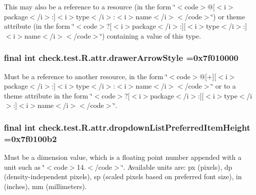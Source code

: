 This may also be a reference to a resource (in the form \char`\"{}$<$code$>$@\mbox{[}$<$i$>$package$<$/i$>$\+:\mbox{]}$<$i$>$type$<$/i$>$\+:$<$i$>$name$<$/i$>$$<$/code$>$\char`\"{}) or theme attribute (in the form \char`\"{}$<$code$>$?\mbox{[}$<$i$>$package$<$/i$>$\+:\mbox{]}\mbox{[}$<$i$>$type$<$/i$>$\+:\mbox{]}$<$i$>$name$<$/i$>$$<$/code$>$\char`\"{}) containing a value of this type. \hypertarget{classcheck_1_1test_1_1_r_1_1attr_a53bf9b90288295d77d63143853ca2beb}{}
\subsubsection[{drawer\+Arrow\+Style}]{\setlength{\rightskip}{0pt plus 5cm}final int check.\+test.\+R.\+attr.\+drawer\+Arrow\+Style =0x7f010000\hspace{0.3cm}{\ttfamily [static]}}\label{classcheck_1_1test_1_1_r_1_1attr_a53bf9b90288295d77d63143853ca2beb}
Must be a reference to another resource, in the form \char`\"{}$<$code$>$@\mbox{[}+\mbox{]}\mbox{[}$<$i$>$package$<$/i$>$\+:\mbox{]}$<$i$>$type$<$/i$>$\+:$<$i$>$name$<$/i$>$$<$/code$>$\char`\"{} or to a theme attribute in the form \char`\"{}$<$code$>$?\mbox{[}$<$i$>$package$<$/i$>$\+:\mbox{]}\mbox{[}$<$i$>$type$<$/i$>$\+:\mbox{]}$<$i$>$name$<$/i$>$$<$/code$>$\char`\"{}. \hypertarget{classcheck_1_1test_1_1_r_1_1attr_ae7b7ef58aa08b5cd48e82ced09e17dca}{}
\subsubsection[{dropdown\+List\+Preferred\+Item\+Height}]{\setlength{\rightskip}{0pt plus 5cm}final int check.\+test.\+R.\+attr.\+dropdown\+List\+Preferred\+Item\+Height =0x7f0100b2\hspace{0.3cm}{\ttfamily [static]}}\label{classcheck_1_1test_1_1_r_1_1attr_ae7b7ef58aa08b5cd48e82ced09e17dca}
Must be a dimension value, which is a floating point number appended with a unit such as \char`\"{}$<$code$>$14.\+5sp$<$/code$>$\char`\"{}. Available units are\+: px (pixels), dp (density-\/independent pixels), sp (scaled pixels based on preferred font size), in (inches), mm (millimeters). 

